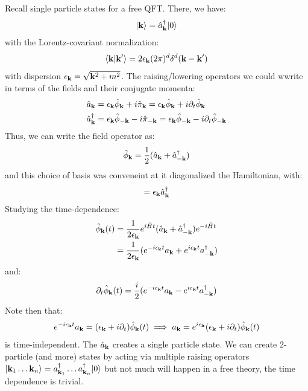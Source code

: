 Recall single particle states for a free QFT. There, we have:
\begin{equation}
    \lvert \mathbf{k} \rangle = \hat{a}^\dagger_{\mathbf{k}}\lvert 0 \rangle
\end{equation}
with the Lorentz-covariant normalization:
\begin{equation}
    \langle \mathbf{k} \lvert \mathbf{k}' \rangle = 2\epsilon_{\mathbf{k}}(2\pi)^d\delta^d(\mathbf{k} - \mathbf{k}')
\end{equation}
with dispersion $\epsilon_{\mathbf{k}} = \sqrt{\mathbf{k}^2 + m^2}$. The raising/lowering operators we could wwrite in terms of the fields and their conjugate momenta:
\begin{equation}
    \begin{split}
        \hat{a}_{\mathbf{k}} &= \epsilon_{\mathbf{k}}\hat{\phi}_{\mathbf{k}} + i\hat{\pi}_{\mathbf{k}} = \epsilon_{\mathbf{k}}\hat{\phi}_{\mathbf{k}} + i\partial_t\hat{\phi}_{\mathbf{k}}
        \\ \hat{a}_{\mathbf{k}}^\dagger &= \epsilon_{\mathbf{k}}\hat{\phi}_{-\mathbf{k}} - i\hat{\pi}_{-\mathbf{k}} = \epsilon_{\mathbf{k}}\hat{\phi}_{-\mathbf{k}} - i\partial_t\hat{\phi}_{-\mathbf{k}}
    \end{split}
\end{equation}
Thus, we can write the field operator as:
\begin{equation}
    \hat{\phi}_{\mathbf{k}} = \frac{1}{2}(\hat{a}_{\mathbf{k}} + \hat{a}^\dagger_{-\mathbf{k}})
\end{equation}
and this choice of basis was conveneint at it diagonalized the Hamiltonian, with:
\begin{equation}
    [\hat{H}, \hat{a}_\v{k}^\dag] = \e_\v{k}\hat{a}^\dag_\v{k}
\end{equation}
Studying the time-dependence:
\begin{equation}
    \begin{split}
        \hat{\phi}_{\mathbf{k}}(t) &= \frac{1}{2\epsilon_{\mathbf{k}}}e^{i\hat{H}t}(\hat{a}_{\mathbf{k}} + \hat{a}^\dagger_{-\mathbf{k}})e^{-i\hat{H}t}
        \\ &= \frac{1}{2\epsilon_{\mathbf{k}}}(e^{-i\epsilon_{\mathbf{k}}t}a_{\mathbf{k}} + e^{i\epsilon_{\mathbf{k}}t}a_{-\mathbf{k}}^\dagger)
    \end{split}
\end{equation}
and:
\begin{equation}
    \partial_t \hat{\phi}_{\mathbf{k}}(t) = \frac{i}{2}(e^{-i\epsilon_{\mathbf{k}}t}a_{\mathbf{k}} - e^{i\epsilon_{\mathbf{k}}t}a_{-\mathbf{k}}^\dagger)
\end{equation}
Note then that:
\begin{equation}
    e^{-i\epsilon_{\mathbf{k}}t}a_{\mathbf{k}} = (\epsilon_{\mathbf{k}} + i\partial_t)\hat{\phi}_{\mathbf{k}}(t) \implies a_{\mathbf{k}} = e^{i\epsilon_{\mathbf{k}}}(\epsilon_{\mathbf{k}} + i\partial_t)\hat{\phi}_{\mathbf{k}}(t)
\end{equation}
is time-independent. The $\hat{a}_{\mathbf{k}}$ creates a single particle state. We can create 2-particle (and more) states by acting via multiple raising operators $\lvert \mathbf{k}_1 \ldots \mathbf{k}_n \rangle = a_{\mathbf{k}_1}^\dagger \ldots a_{\mathbf{k}_n}^\dagger\lvert 0 \rangle$ but not much will happen in a free theory, the time dependence is trivial.

